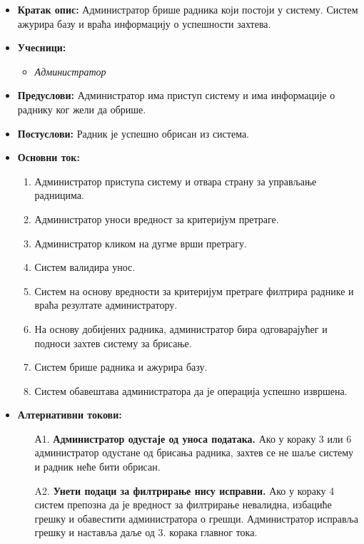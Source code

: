 \documentclass{article}
\begin{document}
\begin{itemize}
    \item \textbf{Кратак опис:} Администратор брише радника који постоји у систему. Систем ажурира базу и враћа информацију о успешности захтева.
    \item \textbf{Учесници:}
        \begin{itemize}
            \item \textit{Администратор}
        \end{itemize}
    \item \textbf{Предуслови:} Администратор има приступ систему и има информације о раднику ког жели да обрише.
    \item \textbf{Постуслови:} Радник је успешно обрисан из система.
    \item \textbf{Основни ток:}
        \begin{enumerate}
            \item Администратор приступа систему и отвара страну за управљање радницима.
            \item Администратор уноси вредност за критеријум претраге.
            \item Администратор кликом на дугме врши претрагу.
            \item Систем валидира унос.
            \item Систем на основу вредности за критеријум претраге филтрира раднике и враћа резултате администратору.
            \item На основу добијених радника, администратор бира одговарајућег и подноси захтев систему за брисање.
            \item Систем брише радника и ажурира базу.
            \item Систем обавештава администратора да је операција успешно извршена.
        \end{enumerate}
    
    \item \textbf{Алтернативни токови:}
        \begin{itemize}
            \item[А1.] \textbf{Администратор одустаје од уноса података.} Ако у кораку 3 или 6 администратор одустане од брисања радника, захтев се не шаље систему и радник неће бити обрисан.
            \item[A2.] \textbf{Унети подаци за филтрирање нису исправни.} Ако у кораку 4 систем препозна да је вредност за филтрирање невалидна, избациће грешку и обавестити администратора о грешци. Администратор исправља грешку и наставља даље од 3. корака главног тока. 
        \end{itemize}
\end{itemize}
\end{document}
